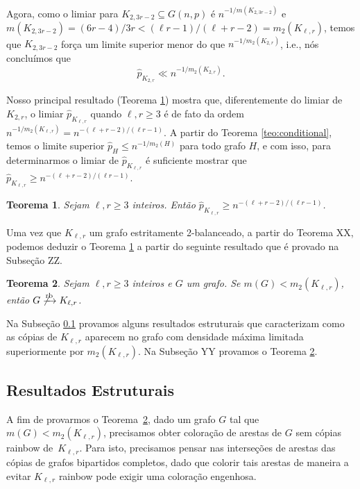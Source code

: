 \documentclass[11pt,twoside,a4paper]{book}
\newcommand{\K}{K_{\ell,r}} %
\newcommand{\rb}{\xrightarrow{\text{\rm rb}}}
\let\subset\subseteq
\newtheorem{teorema}{Teorema}[section]
\theoremstyle{note}
\begin{document}
    Agora, como  o limiar para
    $K_{2,3r-2}\subset G(n,p)$ é $n^{-1/m(K_{2,3r-2})}$ e
    $m(K_{2,3r-2}) = (6r-4)/3r < (\ell r - 1)/(\ell+r-2) =
    m_2(K_{\ell,r})$, 
    temos que $K_{2,3r-2}$ força um limite superior menor do que
     $n^{-1/m_2(K_{2,r})}$, i.e., nós concluímos que
    \[ 
      \hat{p}_{K_{2,r}} \ll n^{-1/m_2(K_{2,r})}.
    \]

    Nosso principal resultado (Teorema \ref{teo:mainrb}) mostra que, diferentemente do limiar de $K_{2,r}$,
    o limiar $\hat{p}_{\K}$ quando $\ell,r \geq 3$ é de fato da ordem 
    $n^{-1/m_2(\K)} = n^{-(\ell+r-2)/(\ell r-1)}$.
    A partir do Teorema \ref{teo:conditional}, temos o limite superior $\hat{p}_H \leq n^{-1/m_2(H)}$ para todo grafo $H$, e com isso, para determinarmos o limiar de $\hat{p}_{\K}$ é suficiente mostrar que 
    $\hat{p}_{\K}\geq n^{-(\ell+r-2)/(\ell r - 1)}$.

    \begin{teorema}\label{teo:mainrb} 
    Sejam $\ell,r \geq 3$ inteiros. 
    Então $\hat{p}_{K_{\ell,r}}\geq n^{-(\ell+r-2)/(\ell r - 1)}$.
    \end{teorema}

    Uma vez que $\K$ um grafo estritamente 2-balanceado, a partir do Teorema XX, podemos deduzir o Teorema \ref{teo:mainrb} a partir do seguinte resultado que é provado na Subseção ZZ.
    
    \begin{teorema}\label{lemma:main} 
        Sejam $\ell,r \geq 3$ inteiros e
        $G$ um grafo. 
        Se $m(G) < m_2(\K)$, então $G \not\rb \K$.
    \end{teorema}

    Na Subseção \ref{sec:rbestrut} provamos alguns resultados estruturais que caracterizam como as cópias de $\K$ aparecem no grafo com densidade máxima limitada superiormente por $m_2(\K)$.
    Na Subseção YY provamos o Teorema \ref{lemma:main}.

\subsection{Resultados Estruturais}
\label{sec:rbestrut}

     A fim de provarmos o Teorema~\ref{lemma:main}, dado um grafo $G$ tal que
     $m(G) < m_2(\K)$, 
     precisamos obter coloração de arestas de $G$ sem cópias rainbow de~$\K$. 
     Para isto, precisamos pensar nas interseções de arestas das cópias de grafos bipartidos completos, dado que colorir tais arestas de maneira a evitar $\K$ rainbow pode exigir uma coloração engenhosa. 
     
\end{document}

